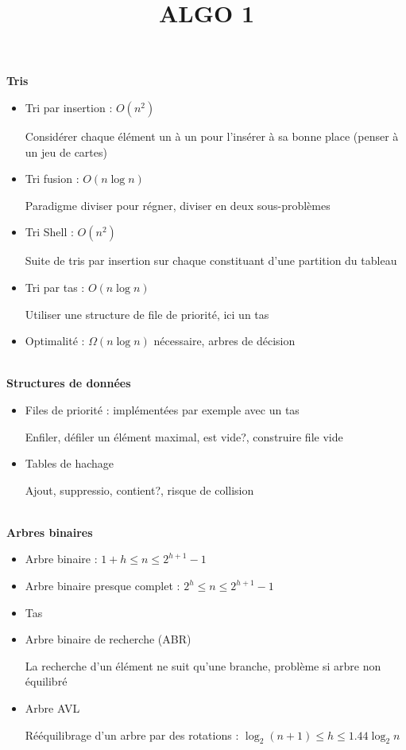 \documentclass[10pt,a4paper]{article}
\newcommand{\cat}[1]{\noindent \textbf{\Large #1}}
\begin{document}
\title{\textbf{ALGO 1}}
\date{}

\maketitle


\cat{Tris}

%
\begin{itemize}[noitemsep]
	\item Tri par insertion : \(  O(n^2)  \)
		
		Considérer chaque élément un à un pour l'insérer à sa bonne place (penser à un jeu de cartes)
		
	\item Tri fusion : \(  O(n\log n)  \)
		
		Paradigme diviser pour régner, diviser en deux sous-problèmes
	\item Tri Shell : \(  O(n^2)  \)
	
		Suite de tris par insertion sur chaque constituant d'une partition du tableau
		
	\item Tri par tas : \(  O(n\log n)  \)
	
		Utiliser une structure de file de priorité, ici un tas
	\item Optimalité : \(  \Omega (n \log n)  \) nécessaire, arbres de décision
\end{itemize}
%
~ \\


\cat{Structures de données}

%
\begin{itemize}[noitemsep]
	\item Files de priorité : implémentées par exemple avec un tas
	
		Enfiler, défiler un élément maximal, est vide?, construire file vide
	\item Tables de hachage
	
		Ajout, suppressio, contient?, risque de collision
\end{itemize}
%
~ \\


\cat{Arbres binaires}

%
\begin{itemize}[noitemsep]
	\item Arbre binaire : \(  1+h \leq n \leq 2^{h+1}-1  \)
	\item Arbre binaire presque complet : %
		\(  2^h \leq n \leq 2^{h+1}-1  \)
	\item Tas
	\item Arbre binaire de recherche (ABR)
	
		La recherche d'un élément ne suit qu'une branche, problème si arbre non équilibré
	\item Arbre AVL
	
		Rééquilibrage d'un arbre par des rotations :
		\(  \log _2(n+1) \leq h \leq 1.44\log _2 n  \)
	
\end{itemize}
%
~ \\
\end{document}
